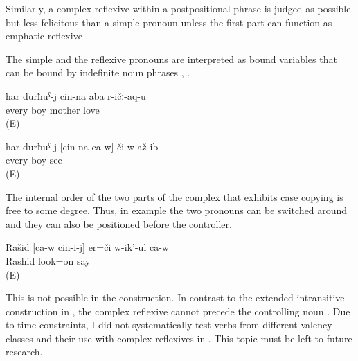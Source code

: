 Similarly, a complex reflexive within a postpositional phrase is judged as possible but less felicitous than a simple pronoun unless the first part can function as emphatic reflexive .

The simple and the reflexive pronouns are interpreted as bound variables that can be bound by indefinite noun phrases , .

\begin{exe}
	\ex	\label{ex:Every boy loves his mother}
	\gll	har	durħuˁ-j	cin-na	aba	r-ičː-aq-u\\
		every	boy		mother	love\\
	\glt	{} (E)

	\ex	\label{ex:Every boy saw himself@25}
	\gll	har	durħuˁ-j	[cin-na	ca-w]	či-w-až-ib\\
		every	boy			see\\
	\glt	{} (E)
\end{exe}


The internal order of the two parts of the complex  that exhibits case copying is free to some degree. Thus, in example  the two pronouns can be switched around and they can also be positioned before the controller.

\begin{exe}
	\ex	\label{ex:Rashid is looking at himself}
	\begin{xlist}
		\ex	\label{ex:Rashid is looking at himself@A}
		\gll	Rašid	[ca-w	cin-i-j]	er=či	w-ik'-ul	ca-w\\
			Rashid			look=on	say	\\
		\glt	{} (E)

		\ex	{}	\label{ex:Rashid is looking at himself@B}

		\ex	{}	\label{ex:Rashid is looking at himself@C}
	\end{xlist}
\end{exe}

This is not possible in the  construction. In contrast to the extended intransitive construction in , the complex reflexive cannot precede the controlling noun . Due to time constraints, I did not systematically test verbs from different valency classes and their use with complex reflexives in . This topic must be left to future research. 

